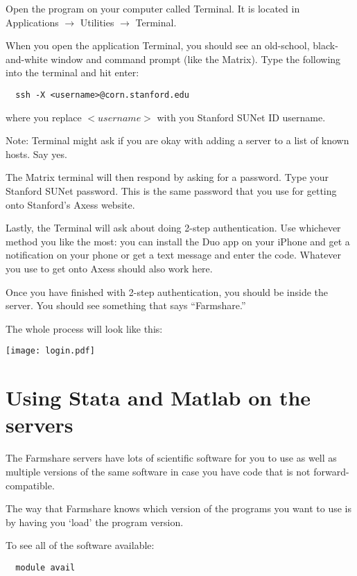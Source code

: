 \documentclass[12pt]{article}
\begin{document}
Open the program on your computer called Terminal. It is located in Applications $\rightarrow$ Utilities $\rightarrow$ Terminal. 

When you open the application Terminal, you should see an old-school, black-and-white window and command prompt (like the Matrix). Type the following into the terminal and hit enter:

\begin{lstlisting}
  ssh -X <username>@corn.stanford.edu
\end{lstlisting}

where you replace $<username>$ with you Stanford SUNet ID username.

Note: Terminal might ask if you are okay with adding a server to a list of known hosts. Say yes.

The Matrix terminal will then respond by asking for a password. Type your Stanford SUNet password. This is the same password that you use for getting onto Stanford's Axess website.

Lastly, the Terminal will ask about doing 2-step authentication. Use whichever method you like the most: you can install the Duo app on your iPhone and get a notification on your phone or get a text message and enter the code. Whatever you use to get onto Axess should also work here.

Once you have finished with 2-step authentication, you should be inside the server. You should see something that says ``Farmshare.''

The whole process will look like this:

\texttt{[image: login.pdf]}







\section{Using Stata and Matlab on the servers}

The Farmshare servers have lots of scientific software for you to use as well as multiple versions of the same software in case you have code that is not forward-compatible.

The way that Farmshare knows which version of the programs you want to use is by having you `load' the program version. 

To see all of the software available:

\begin{lstlisting}
  module avail
\end{lstlisting}
\end{document}
